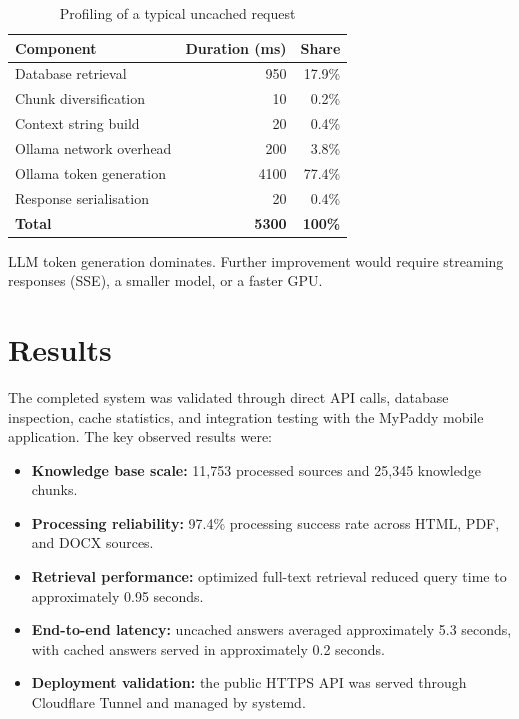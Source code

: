 \documentclass[12pt,a4paper]{report}
\begin{document}
\begin{table}[H]
\centering
\caption{Profiling of a typical uncached request}
\begin{tabular}{lrr}
\toprule
\textbf{Component} & \textbf{Duration (ms)} & \textbf{Share} \\
\midrule
Database retrieval       & 950  & 17.9\% \\
Chunk diversification    & 10   & 0.2\% \\
Context string build     & 20   & 0.4\% \\
Ollama network overhead  & 200  & 3.8\% \\
Ollama token generation  & 4100 & 77.4\% \\
Response serialisation   & 20   & 0.4\% \\
\midrule
\textbf{Total}           & \textbf{5300} & \textbf{100\%} \\
\bottomrule
\end{tabular}
\end{table}

LLM token generation dominates. Further improvement would require streaming responses (SSE), a smaller model, or a faster GPU.

\chapter{Results}

The completed system was validated through direct API calls, database inspection, cache statistics, and integration testing with the MyPaddy mobile application. The key observed results were:

\begin{itemize}[nosep]
    \item \textbf{Knowledge base scale:} 11,753 processed sources and 25,345 knowledge chunks.
    \item \textbf{Processing reliability:} 97.4\% processing success rate across HTML, PDF, and DOCX sources.
    \item \textbf{Retrieval performance:} optimized full-text retrieval reduced query time to approximately 0.95 seconds.
    \item \textbf{End-to-end latency:} uncached answers averaged approximately 5.3 seconds, with cached answers served in approximately 0.2 seconds.
    \item \textbf{Deployment validation:} the public HTTPS API was served through Cloudflare Tunnel and managed by systemd.
\end{itemize}
\end{document}
